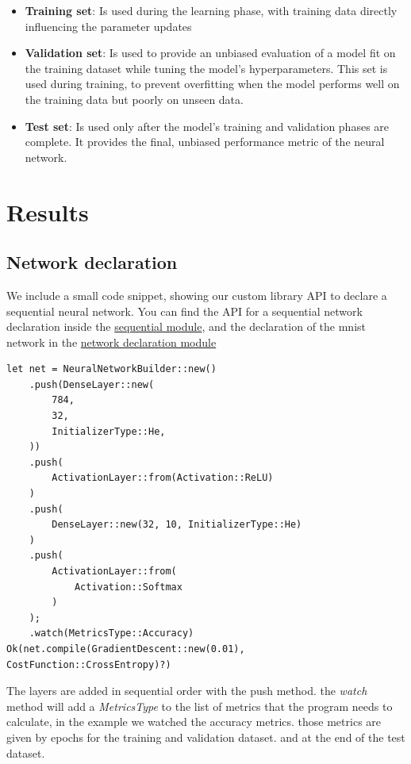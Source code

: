 \documentclass[a4paper, twocolumn, twoside]{article}
\begin{document}
	\begin{itemize}
        \item{\textbf{Training set}}: Is used during the learning phase,
        with training data directly influencing the parameter updates
        \item{\textbf{Validation set}}: Is used to provide an unbiased evaluation of a model fit
        on the training dataset while tuning the model's hyperparameters.
        This set is used during training, to prevent overfitting when the model performs well on the training data
        but poorly on unseen data.
        \item{\textbf{Test set}}: Is used only after the model's training and validation phases are complete.
	It provides the final, unbiased performance metric of the neural network.
	\end{itemize}

	\section{Results}
    \subsection{Network declaration}
	We include a small code snippet, showing our custom library API to declare a sequential neural network. You can find the API for a sequential network declaration inside the \href{https://github.com/dirdr/neural_network_from_scratch/blob/main/nn_lib/src/sequential.rs}{sequential module}, and the declaration of the mnist network in the \href{https://github.com/dirdr/neural_network_from_scratch/blob/main/mnist/src/network_definition.rs}{network declaration module}

	\begin{verbatim}
let net = NeuralNetworkBuilder::new()
	.push(DenseLayer::new(
		784,
		32,
		InitializerType::He,
	))
	.push(
		ActivationLayer::from(Activation::ReLU)
	)
	.push(
		DenseLayer::new(32, 10, InitializerType::He)
	)
	.push(
		ActivationLayer::from(
			Activation::Softmax
		)
	);
	.watch(MetricsType::Accuracy)
Ok(net.compile(GradientDescent::new(0.01), CostFunction::CrossEntropy)?)
	\end{verbatim}

	The layers are added in sequential order with the push method.
	the \textit{watch} method will add a \textit{MetricsType} to the list of metrics that the program needs to calculate, in the example we watched the accuracy metrics.
	those metrics are given by epochs for the training and validation dataset. and at the end of the test dataset.
\end{document}
